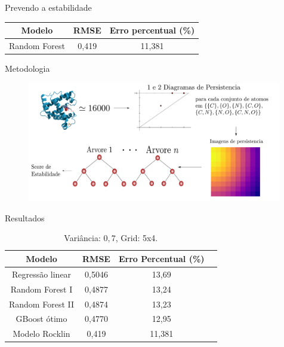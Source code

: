 \documentclass[10pt]{beamer}
\begin{document}
\begin{frame}{Prevendo a estabilidade}
  \begin{table}
      \begin{tabular}{@{}ccc@{}}
      \toprule
      Modelo          & RMSE & Erro percentual (\%) \\ \midrule
      Random Forest & 0,419         & 11,381          \\ \bottomrule
      \end{tabular}
      \label{tab:rocklin}
  \end{table}
\end{frame}

\begin{frame}{Metodologia}
    \begin{figure}
        \centering
        \includegraphics[width=0.99\textwidth]{../images/proteinpipeline.pdf}
    \end{figure}
\end{frame}

\begin{frame}{Resultados}
    \begin{table}[]
    \begin{tabular}{@{}cccc@{}}
    \toprule
    Modelo              & RMSE   & Erro Percentual (\%) \\ \midrule
    Regressão linear & 0,5046 & 13,69              \\
    Random Forest I        & 0,4877 & 13,24              \\
    Random Forest II    & 0,4874 & 13,23              \\
    GBoost ótimo     & 0,4770 & 12,95              \\
    Modelo Rocklin \cite{Rocklin2017} & 0,419 & 11,381 \\ 
    \bottomrule
    \end{tabular}
    \caption{Variância: $0,7$, Grid: 5x4.}
  \end{table}
\end{frame}
\end{document}
